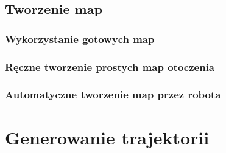 \subsection{Tworzenie map}

\subsubsection{Wykorzystanie gotowych map}

\subsubsection{Ręczne tworzenie prostych map otoczenia}

\subsubsection{Automatyczne tworzenie map przez robota}

\section{Generowanie trajektorii}

